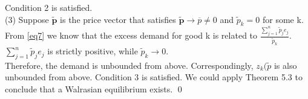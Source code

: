 \documentclass[letterpaper,12pt]{article}
\theoremstyle{definition}
\begin{document}
Condition 2 is satisfied.\\
(3) Suppose $\tilde{\mathbf{p}}$ is the price vector that satisfies  ${\tilde{\mathbf{p}}} \rightarrow \overline{p} \neq 0$ and $\tilde{p}_k = 0$ for some k.\\
From \ref{eq7} we know that the excess demand for good k is related to $\frac{\sum_{j=1}^{n}\tilde{p}_j e_j}{\tilde{p}_k}$. $\sum_{j=1}^{n}\tilde{p}_j e_j$ is strictly positive, while $\tilde{p}_k \rightarrow 0$.\\
Therefore, the demand is unbounded from above. Correspondingly, ${z_k(\tilde{p}}$ is also unbounded from above. Condition 3 is satisfied. We could apply Theorem 5.3 to conclude that a Walrasian equilibrium exists. \qed\\
\end{document}

